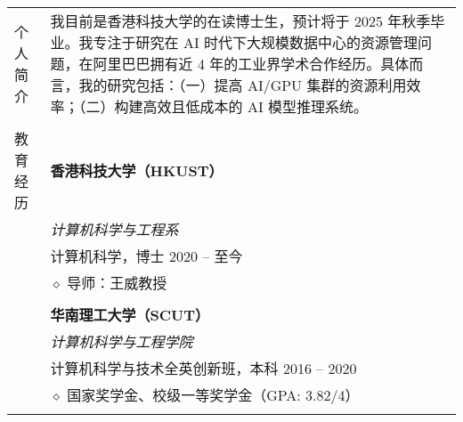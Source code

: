 \documentclass[letterpaper, 10pt]{article}
\begin{document}
\begin{longtable}{p{1.3in}p{5.0in}}

{个人简介}
& 我目前是香港科技大学的在读博士生，预计将于 2025 年秋季毕业。我专注于研究在 AI 时代下大规模数据中心的资源管理问题，在阿里巴巴拥有近 4 年的工业界学术合作经历。具体而言，我的研究包括：（一）提高 AI/GPU 集群的资源利用效率；（二）构建高效且低成本的 AI 模型推理系统。 \\
& \\

{教育经历}
& \textbf{香港科技大学（HKUST）} \\
& \textit{计算机科学与工程系} \\
& 计算机科学，博士 \hfill 2020 -- 至今 \\
& $\diamond$ 导师：王威教授 \\
& \\

& \textbf{华南理工大学（SCUT）} \\
& \textit{计算机科学与工程学院} \\
& 计算机科学与技术全英创新班，本科 \hfill 2016 -- 2020 \\
& $\diamond$ 国家奖学金、校级一等奖学金（GPA: 3.82/4） \\
& \\



\end{longtable}
\end{document}
